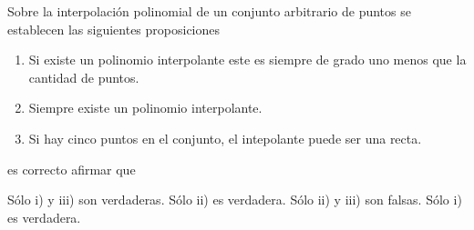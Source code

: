 \begin{pregunta}
\begin{cuerpo}
Sobre la interpolaci\'on polinomial de un conjunto arbitrario de puntos se establecen las siguientes proposiciones 
\begin{enumerate}
	\item[i)] Si existe un polinomio interpolante este es siempre de grado uno menos que la cantidad de puntos.
    \item[ii)] Siempre existe un polinomio interpolante.
    \item[iii)] Si hay cinco puntos en el conjunto, el intepolante puede ser una recta.
\end{enumerate}
es correcto afirmar que
\end{cuerpo}
\begin{alternativas}
{Sólo i) y iii) son verdaderas.}
{Sólo ii) es verdadera.}
{Sólo ii) y iii) son falsas.}
{Sólo i) es verdadera.}
\end{alternativas}
\justificacion{0cm}
\end{pregunta}